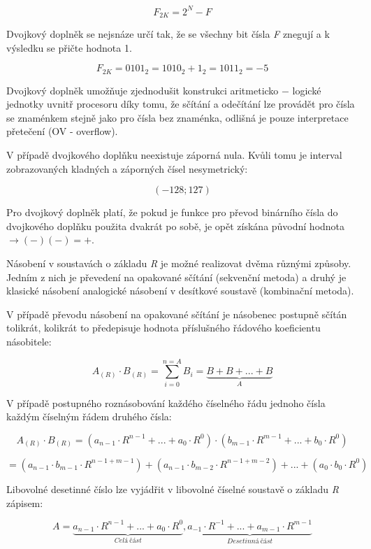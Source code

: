 $$ F_{2K} = 2^N - F $$

Dvojkový doplněk se nejsnáze určí tak, že se všechny bit čísla {\it F} znegují a k výsledku se přičte hodnota 1.

$$ F_{2K} = 0101_{2} = 1010_{2}+1_{2} = 1011_{2} = -5 $$ 

Dvojkový doplněk umožňuje zjednodušit konstrukci aritmeticko $-$ logické jednotky uvnitř procesoru díky tomu, že sčítání a odečítání lze provádět pro čísla se znaménkem stejně jako pro čísla bez znaménka, odlišná je pouze interpretace přetečení (OV - overflow).

V případě dvojkového doplňku neexistuje záporná nula. Kvůli tomu je interval zobrazovaných kladných a záporných čísel nesymetrický:

$$(-128 ; 127)$$

Pro dvojkový doplněk platí, že pokud je funkce pro převod binárního čísla do dvojkového doplňku použita dvakrát po sobě, je opět získána původní hodnota $\rightarrow (-) (-)= +$.



Násobení v soustavách o základu {\it R} je možné realizovat dvěma různými způsoby. Jedním z nich je převedení na opakované sčítání (sekvenční metoda) a druhý je klasické násobení analogické násobení v desítkové soustavě (kombinační metoda). 

V případě převodu násobení na opakované sčítání je násobenec postupně sčítán tolikrát, kolikrát to předepisuje hodnota příslušného řádového koeficientu násobitele:

$$ A_{(R)} \cdot B_{(R)} = \sum_{i=0}^{n=A} B_i = \underbrace{B + B + ... + B}_A $$

V případě postupného roznásobování každého číselného řádu jednoho čísla každým číselným řádem druhého čísla:

$$ A_{(R)} \cdot B_{(R)} = (a_{n-1} \cdot R^{n-1} + ... + a_0 \cdot R^0) \cdot (b_{m-1} \cdot R^{m-1} + ... + b_0 \cdot R^0) $$

$$  = (a_{n-1} \cdot b_{m-1} \cdot R^{n-1+m-1})+ (a_{n-1} \cdot b_{m-2} \cdot R^{n-1+m-2}) +... + (a_0 \cdot b_0 \cdot R^{0})$$



Libovolné desetinné číslo lze vyjádřit v libovolné číselné soustavě o základu {\it R} zápisem:

$$ A = \underbrace{a_{n-1}\cdot R^{n-1} + ... +a_0 \cdot R^0}_{Celá~část},\underbrace{a_{-1}\cdot R^{-1}+ ... +a_{m-1}\cdot R^{m-1}}_{Desetinná~část} $$

